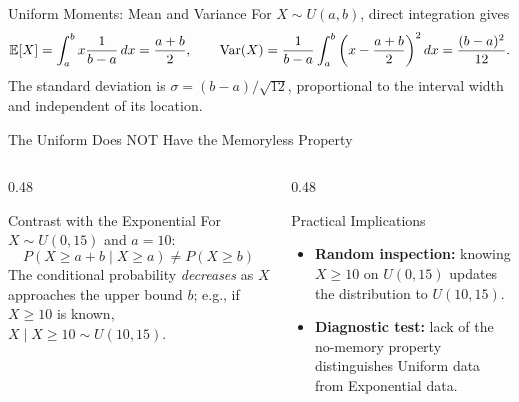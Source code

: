 \documentclass[aspectratio=169,xcolor={dvipsnames,table}]{beamer}
\begin{document}
\begin{frame}{Uniform Moments: Mean and Variance}
\scriptsize
For $X\sim U(a,b)$, direct integration gives
\[
\mathbb{E}[X]=\int_a^b x\frac{1}{b-a}\,dx=\frac{a+b}{2},
\qquad
\operatorname{Var}(X)=\frac{1}{b-a}\int_a^b\left(x-\frac{a+b}{2}\right)^2dx
       =\frac{(b-a)^2}{12}.
\]
The standard deviation is $\sigma=(b-a)/\sqrt{12}$, proportional to the interval
width and independent of its location.
\end{frame}

\begin{frame}{The Uniform Does NOT Have the Memoryless Property}
	\vspace{-0.15cm}
	\begin{columns}[T]
		\begin{column}{0.48\textwidth}
			\begin{block}{Contrast with the Exponential}
				\footnotesize
				For $X \sim U(0, 15)$ and $a = 10$:
				$$P(X \ge a{+}b \mid X \ge a) \ne P(X \ge b)$$
				The conditional probability \emph{decreases} as $X$ approaches the upper bound $b$; e.g., if $X \ge 10$ is known, $X \mid X\ge10 \sim U(10,15)$.
			\end{block}
		\end{column}
		\begin{column}{0.48\textwidth}
			\begin{alertblock}{Practical Implications}
				\footnotesize
				\begin{itemize}\itemsep=0.03cm
					\item \textbf{Random inspection:} knowing $X \ge 10$ on $U(0,15)$ updates the distribution to $U(10,15)$.
					\item \textbf{Diagnostic test:} lack of the no-memory property distinguishes Uniform data from Exponential data.
				\end{itemize}
			\end{alertblock}
		\end{column}
	\end{columns}
\end{frame}
\end{document}
